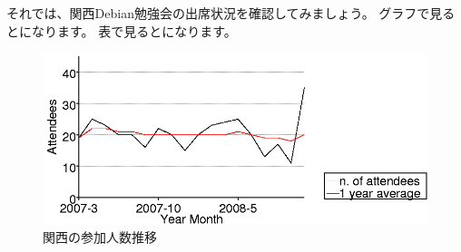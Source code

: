 \documentclass[mingoth,a4paper]{jsarticle}
\begin{document}
\begin{commandline}
それでは、関西Debian勉強会の出席状況を確認してみましょう。
グラフで見るとになります。
表で見るとになります。

\begin{figure}[h]
 \begin{center}
  \includegraphics[width=1\hsize]{image200812/kansai.png}
 \end{center}
\caption{関西の参加人数推移}
\label{fig:kansaipeoplechart-1}
\end{figure}



\end{commandline}
\end{document}
